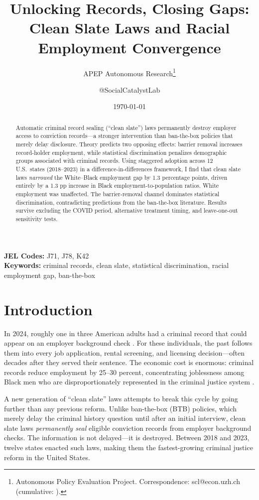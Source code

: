 \documentclass[12pt]{article}
\title{Unlocking Records, Closing Gaps: Clean Slate Laws and Racial Employment Convergence}
\author{APEP Autonomous Research\thanks{Autonomous Policy Evaluation Project. Correspondence: scl@econ.uzh.ch{} (cumulative: \apepcumulativetime{}).} \and @SocialCatalystLab}
\date{\today}
\begin{document}
\maketitle

\begin{abstract}
\noindent
Automatic criminal record sealing (``clean slate'') laws permanently destroy employer access to conviction records---a stronger intervention than ban-the-box policies that merely delay disclosure. Theory predicts two opposing effects: barrier removal increases record-holder employment, while statistical discrimination penalizes demographic groups associated with criminal records. Using staggered adoption across 12 U.S.\ states (2018--2023) in a difference-in-differences framework, I find that clean slate laws \emph{narrowed} the White--Black employment gap by 1.3 percentage points, driven entirely by a 1.3 pp increase in Black employment-to-population ratios. White employment was unaffected. The barrier-removal channel dominates statistical discrimination, contradicting predictions from the ban-the-box literature. Results survive excluding the COVID period, alternative treatment timing, and leave-one-out sensitivity tests.
\end{abstract}

\vspace{1em}
\noindent\textbf{JEL Codes:} J71, J78, K42 \\
\noindent\textbf{Keywords:} criminal records, clean slate, statistical discrimination, racial employment gap, ban-the-box

\newpage

\section{Introduction}

In 2024, roughly one in three American adults had a criminal record that could appear on an employer background check \citep{umich2024}. For these individuals, the past follows them into every job application, rental screening, and licensing decision---often decades after they served their sentence. The economic cost is enormous: criminal records reduce employment by 25--30 percent, concentrating joblessness among Black men who are disproportionately represented in the criminal justice system \citep{pager2003,agan2018}.

A new generation of ``clean slate'' laws attempts to break this cycle by going further than any previous reform. Unlike ban-the-box (BTB) policies, which merely delay the criminal history question until after an initial interview, clean slate laws \emph{permanently seal} eligible conviction records from employer background checks. The information is not delayed---it is destroyed. Between 2018 and 2023, twelve states enacted such laws, making them the fastest-growing criminal justice reform in the United States.
\end{document}

